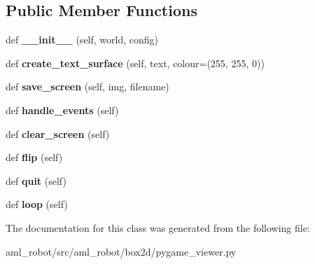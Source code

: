 \subsection*{Public Member Functions}
\begin{DoxyCompactItemize}
\item 
\hypertarget{classaml__robot_1_1box2d_1_1pygame__viewer_1_1_py_game_viewer_ab5e8f8f08d5a85e2dbebbdccfa0d05e0}{}\label{classaml__robot_1_1box2d_1_1pygame__viewer_1_1_py_game_viewer_ab5e8f8f08d5a85e2dbebbdccfa0d05e0} 
def {\bfseries \+\_\+\+\_\+init\+\_\+\+\_\+} (self, world, config)
\item 
\hypertarget{classaml__robot_1_1box2d_1_1pygame__viewer_1_1_py_game_viewer_a8221c03a64ca619454a92ed4a2319047}{}\label{classaml__robot_1_1box2d_1_1pygame__viewer_1_1_py_game_viewer_a8221c03a64ca619454a92ed4a2319047} 
def {\bfseries create\+\_\+text\+\_\+surface} (self, text, colour=(255, 255, 0))
\item 
\hypertarget{classaml__robot_1_1box2d_1_1pygame__viewer_1_1_py_game_viewer_af29ac357163b6817aaaa0f3ad60bc96e}{}\label{classaml__robot_1_1box2d_1_1pygame__viewer_1_1_py_game_viewer_af29ac357163b6817aaaa0f3ad60bc96e} 
def {\bfseries save\+\_\+screen} (self, img, filename)
\item 
\hypertarget{classaml__robot_1_1box2d_1_1pygame__viewer_1_1_py_game_viewer_aaa17bedd82fce8f72ff438b1bc32cbed}{}\label{classaml__robot_1_1box2d_1_1pygame__viewer_1_1_py_game_viewer_aaa17bedd82fce8f72ff438b1bc32cbed} 
def {\bfseries handle\+\_\+events} (self)
\item 
\hypertarget{classaml__robot_1_1box2d_1_1pygame__viewer_1_1_py_game_viewer_a054015487ce1c4dd49b53a22ee5e9698}{}\label{classaml__robot_1_1box2d_1_1pygame__viewer_1_1_py_game_viewer_a054015487ce1c4dd49b53a22ee5e9698} 
def {\bfseries clear\+\_\+screen} (self)
\item 
\hypertarget{classaml__robot_1_1box2d_1_1pygame__viewer_1_1_py_game_viewer_a18a725db8deaceeb8a2deb27319cd4c3}{}\label{classaml__robot_1_1box2d_1_1pygame__viewer_1_1_py_game_viewer_a18a725db8deaceeb8a2deb27319cd4c3} 
def {\bfseries flip} (self)
\item 
\hypertarget{classaml__robot_1_1box2d_1_1pygame__viewer_1_1_py_game_viewer_ab3e66ee1f73b5f7acfe64b93fff32195}{}\label{classaml__robot_1_1box2d_1_1pygame__viewer_1_1_py_game_viewer_ab3e66ee1f73b5f7acfe64b93fff32195} 
def {\bfseries quit} (self)
\item 
\hypertarget{classaml__robot_1_1box2d_1_1pygame__viewer_1_1_py_game_viewer_ab09f117ccbb3986e35621935d8d3522b}{}\label{classaml__robot_1_1box2d_1_1pygame__viewer_1_1_py_game_viewer_ab09f117ccbb3986e35621935d8d3522b} 
def {\bfseries loop} (self)
\end{DoxyCompactItemize}


The documentation for this class was generated from the following file\+:\begin{DoxyCompactItemize}
\item 
aml\+\_\+robot/src/aml\+\_\+robot/box2d/pygame\+\_\+viewer.\+py\end{DoxyCompactItemize}
